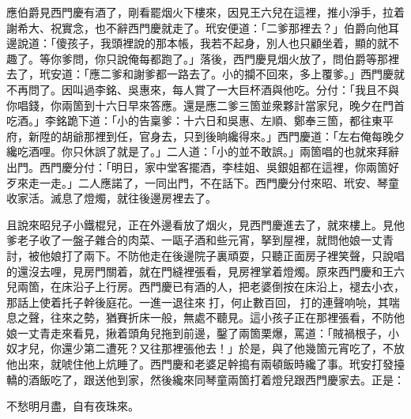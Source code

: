 應伯爵見西門慶有酒了，剛看罷烟火下樓來，因見王六兒在這裡，推小淨手，拉着謝希大、祝實念，也不辭西門慶就走了。玳安便道：「二爹那裡去？」伯爵向他耳邊說道：「傻孩子，我頭裡說的那本帳，我若不起身，別人也只顧坐着，顯的就不趣了。等你爹問，你只說俺每都跑了。」落後，西門慶見烟火放了，問伯爵等那裡去了，玳安道：「應二爹和謝爹都一路去了。小的攔不回來，多上覆爹。」西門慶就不再問了。因叫過李銘、吳惠來，每人賞了一大巨杯酒與他吃。分付：「我且不與你唱錢，你兩箇到十六日早來答應。還是應二爹三箇並衆夥計當家兒，晚夕在門首吃酒。」李銘跪下道：「小的告稟爹：十六日和吳惠、左順、鄭奉三箇，都往東平府，新陞的胡爺那裡到任，官身去，只到後晌纔得來。」西門慶道：「左右俺每晚夕纔吃酒哩。你只休誤了就是了。」二人道：「小的並不敢誤。」兩箇唱的也就來拜辭出門。西門慶分付：「明日，家中堂客擺酒，李桂姐、吳銀姐都在這裡，你兩箇好歹來走一走。」二人應諾了，一同出門，不在話下。西門慶分付來昭、玳安、琴童收家活。滅息了燈燭，就往後邊房裡去了。

且說來昭兒子小鐵棍兒，正在外邊看放了烟火，見西門慶進去了，就來樓上。見他爹老子收了一盤子雜合的肉菜、一甌子酒和些元宵，拏到屋裡，就問他娘一丈青討，被他娘打了兩下。不防他走在後邊院子裏頑耍，只聽正面房子裡笑聲，只說唱的還沒去哩，見房門關着，就在門縫裡張看，見房裡掌着燈燭。原來西門慶和王六兒兩箇，在床沿子上行房。西門慶已有酒的人，把老婆倒按在床沿上，褪去小衣，那話上使着托子幹後庭花。一進一退往來𢵞打，何止數百回，𢵞打的連聲响喨，其喘息之聲，往來之勢，猶賽折床一般，無處不聽見。這小孩子正在那裡張看，不防他娘一丈青走來看見，揪着頭角兒拖到前邊，鑿了兩箇栗爆，罵道：「賊禍根子，小奴才兒，你還少第二遭死？又往那裡張他去！」於是，與了他幾箇元宵吃了，不放他出來，就唬住他上炕睡了。西門慶和老婆足幹搗有兩頓飯時纔了事。玳安打發擡轎的酒飯吃了，跟送他到家，然後纔來同琴童兩箇打着燈兒跟西門慶家去。正是：

\begin{myquote}
不愁明月盡，自有夜珠來。
\end{myquote}

